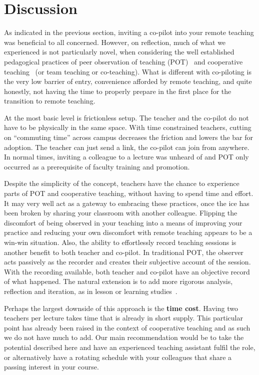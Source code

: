 \documentclass[sigconf,natbib=false]{acmart}
\begin{document}
\section{Discussion}

As indicated in the previous section, inviting a co-pilot into your remote teaching was beneficial to all concerned. However, on reflection, much of what we experienced is not particularly novel, when considering the well established pedagogical practices of peer observation of teaching (POT)~\cite{PeerObservation} and cooperative teaching~\cite{bauwens1995cooperative} (or team teaching or co-teaching). What is different with co-piloting is the very low barrier of entry, convenience afforded by remote teaching, and quite honestly, not having the time to properly prepare in the first place for the transition to remote teaching.

At the most basic level is frictionless setup. The teacher and the co-pilot do not have to be physically in the same space. With time constrained teachers, cutting on \enquote{commuting time} across campus decreases the friction and lowers the bar for adoption. The teacher can just send a link, the co-pilot can join from anywhere. In normal times, inviting a colleague to a lecture was unheard of and POT only occurred as a prerequisite of faculty training and promotion.

Despite the simplicity of the concept, teachers have the chance to experience parts of POT and cooperative teaching, without having to spend time and effort. It may very well act as a gateway to embracing these practices, once the ice has been broken by sharing your classroom with another colleague. Flipping the discomfort of being observed in your teaching into a means of improving your practice and reducing your own discomfort with remote teaching appears to be a win-win situation. Also, the ability to effortlessly record teaching sessions is another benefit to both teacher and co-pilot. In traditional POT, the observer acts passively as the recorder and creates their subjective account of the session. With the recording available, both teacher and co-pilot have an objective record of what happened. The natural extension is to add more rigorous analysis, reflection and iteration, as in lesson or learning studies~\cite{NecessaryConditionsOfLearning}.

Perhaps the largest downside of this approach is the \textbf{time cost}. Having two teachers per lecture takes time that is already in short supply. This particular point has already been raised in the context of cooperative teaching and as such we do not have much to add. Our main recommendation would be to take the potential described here and have an experienced teaching assistant fulfil the role, or alternatively have a rotating schedule with your colleagues that share a passing interest in your course.
\end{document}
